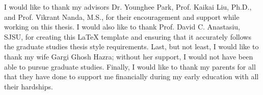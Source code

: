 I would like to thank my advisors Dr. Younghee Park, Prof. Kaikai Liu, Ph.D., and Prof. Vikrant Nanda, M.S., for their encouragement and support while working on this thesis. I would also like to thank Prof. David C. Anastasiu, SJSU, for creating this LaTeX template and ensuring that it accurately follows the graduate studies thesis style requirements. Last, but not least, I would like to thank my wife Gargi Ghosh Hazra; without her support, I would not have been able to pursue graduate studies. Finally, I would like to thank my parents for all that they have done to support me financially during my early education with all their hardships.